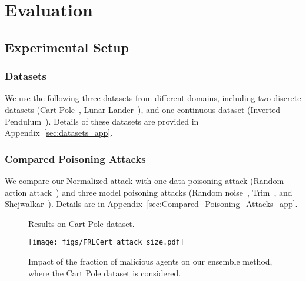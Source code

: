  
 
 \section{Evaluation}  
 \label{sec:exp}


\subsection{Experimental Setup} 

\subsubsection{Datasets}
We use the following three datasets from different domains, including two discrete datasets (Cart Pole~\cite{barto1983neuronlike}, Lunar Lander~\cite{duan2016benchmarking}), and one continuous dataset (Inverted Pendulum~\cite{barto1983neuronlike}).
Details of these datasets are provided in Appendix~\ref{sec:datasets_app}.



\subsubsection{Compared Poisoning Attacks}


We compare our Normalized attack with one data poisoning attack (Random action attack~\cite{fan2021fault}) and three model poisoning attacks (Random noise~\cite{fan2021fault}, Trim~\cite{fang2020local}, and Shejwalkar~\cite{shejwalkar2021manipulating}). Details are in Appendix~\ref{sec:Compared_Poisoning_Attacks_app}.


\begin{figure*}[!t]
	\centering
	\caption{Results on Cart Pole dataset.}
	\label{Results_CartPole}
\end{figure*}


\begin{figure*}
    \centering
    \texttt{[image: figs/FRLCert\_attack\_size.pdf]}
    \caption{Impact of the fraction of malicious agents on our ensemble method, where the Cart Pole dataset is considered.}
    \label{fig:frac_of_mali}
\end{figure*}


